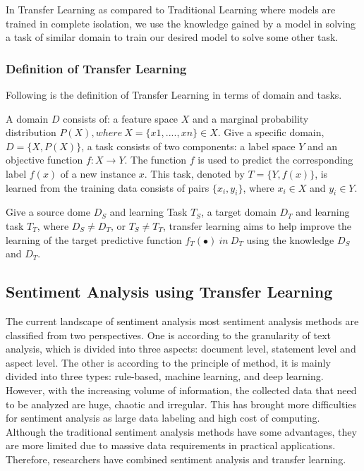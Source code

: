 \documentclass[a4paper, 12pt]{article}
\begin{document}
\begin{sloppypar}
In Transfer Learning as compared to Traditional Learning  where models are trained in complete  isolation, we use the knowledge gained by a model in solving a task of similar domain to train our desired model to solve some other task.

\subsubsection{Definition of Transfer Learning}

Following is the definition of Transfer Learning in terms of domain and tasks.

A domain $D$ consists of: a feature space $X$ and a marginal probability distribution $P(X), where\ X = \{x1, ...., xn\} \in X$.  Give a specific domain, $D = \{X, P(X)\}$, a task consists of two components: a label space $Y$ and an objective function $f: X \rightarrow Y$. The function $f$ is used to predict the corresponding label $f(x)$ of a new instance $x$. This task, denoted by $T = \{Y, f(x)\}$, is learned from the training data consists of pairs $\{x_i, y_i\}$, where $x_i \in X$ and $y_i \in Y$.\cite{lin_improving_2017}

Give a source dome $D_S$ and learning Task $T_S$, a target domain $D_T$  and learning task $T_T$, where $D_S \ne D_T$, or $T_S \ne T_T$, transfer learning aims to help improve the learning of the target predictive function $f_T( \bullet ) \ in \ D_T$ using the knowledge $D_S$ and $D_T$.\cite{lin_improving_2017}

\subsection{Sentiment Analysis using Transfer Learning}

The current landscape of sentiment analysis most sentiment analysis methods are classified from two perspectives. One is according to the granularity of text analysis, which is divided into three aspects: document level, statement level and aspect level. The other is according to the principle of method, it is mainly divided into three types: rule-based, machine learning, and deep learning. However, with the increasing volume of information, the collected data that need to be analyzed are huge, chaotic and irregular. This has brought more difficulties for sentiment analysis as large data labeling and high cost of computing. Although the traditional sentiment analysis methods have some advantages, they are more limited due to massive data requirements in practical applications. Therefore, researchers have combined sentiment analysis and transfer learning.\cite{liu_survey_2019}


\end{sloppypar}
\end{document}
